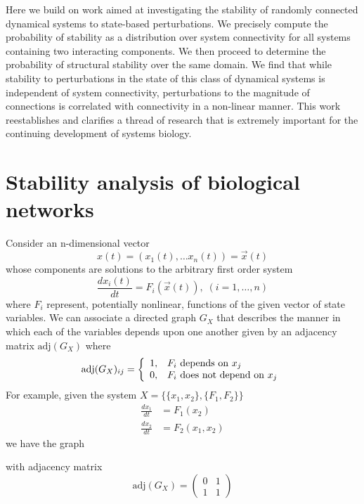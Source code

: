 \documentclass{amsart}
\theoremstyle{definition}
\theoremstyle{remark}
\numberwithin{equation}{section}
\def\adj{\mathrm{adj}}
\begin{document}
Here we build on work aimed at investigating the stability of randomly connected dynamical systems to state-based perturbations. We precisely compute the probability of stability as a distribution over system connectivity for all systems containing two interacting components. We then proceed to determine the probability of structural stability over the same domain. We find that while stability to perturbations in the state of this class of dynamical systems is independent of system connectivity, perturbations to the magnitude of connections is correlated with connectivity in a non-linear manner. This work reestablishes and clarifies a thread of research that is extremely important for the continuing development of systems biology.

\section{Stability analysis of biological networks}\label{sec:stabanalbn}
Consider an n-dimensional vector
$$
x(t) = (x_1(t), \ldots x_n(t)) = \vec{x}(t)
$$
whose components are solutions to the arbitrary first order system
$$
\frac{dx_i(t)}{dt} = F_i(\vec{x}(t)), \; (i=1,\ldots,n)
$$
where $F_i$ represent, potentially nonlinear, functions of the given vector of state variables. We can associate a directed graph $G_X$ that describes the manner in which each of the variables depends upon one another given by an adjacency matrix $\adj(G_X)$ where
 \begin{displaymath}
   \adj(G_X)_{ij} = \left\{
     \begin{array}{ll}
       1, & F_i \hbox{ depends on } x_j\\
       0, & F_i \hbox{ does not depend on } x_j
     \end{array}
   \right.
\end{displaymath}
For example, given the system $X = \{\{x_1,x_2\},\{F_1,F_2\}\}$
\begin{align*}
\frac{dx_1}{dt} & = F_1(x_2)\\
\frac{dx_2}{dt} & = F_2(x_1,x_2)
\end{align*}
we have the graph
\begin{center}

\end{center}
with adjacency matrix
$$
\adj(G_X) = \begin{pmatrix}
0 & 1 \\
1 & 1
\end{pmatrix}
$$
\end{document}
